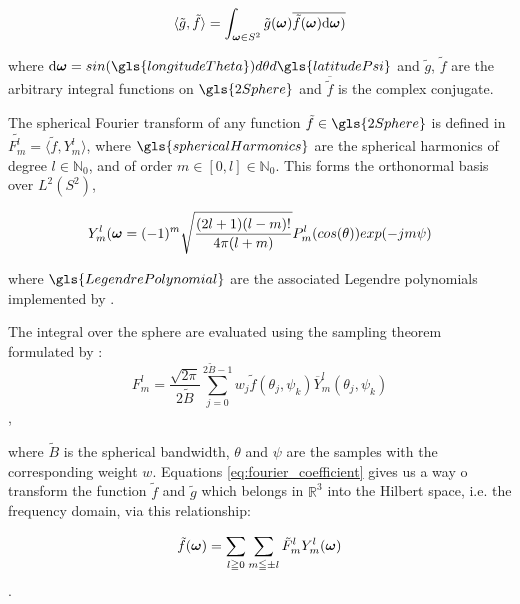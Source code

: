 \begin{equation}\label{eq:hilbert_product}
  \langle \tilde{g} , \tilde{f} \rangle= 
  \int_{\vb*{\omega} \in S^2} 
  \tilde{g}({\vb*{\omega}})\overline{\tilde{f}(\vb*{\omega}) \mathrm{d}\vb*{\omega})}
\end{equation}

where $\mathrm{d}\vb*{\omega} = sin(\gls{longitudeTheta})d\theta d\gls{latitudePsi}$ and $\tilde{g}$, $\tilde{f}$ are the arbitrary 
integral functions on $\gls{2Sphere}$ and $\overline{\tilde{f}}$ is the complex conjugate. 

The spherical Fourier transform of any function $\tilde{f} \in \gls{2Sphere}$ is defined
in $\tilde{F_m^l}= \langle \tilde{f}, Y_m^l \rangle $, where $\gls{sphericalHarmonics}$ are the spherical
harmonics of degree $l \in \mathbb{N}_0$, and of order $m \in [0,l] \in \mathbb{N}_0$.
This forms the orthonormal basis over $L^2(S^2)$,

\begin{equation}\label{eq:spherical_coefficient}
  Y^l_m(\vb*{\omega} = (-1)^m
  \sqrt{ \frac{(2l+1)(l-m)!}{4\pi(l+m)}} 
  P^l_m(cos(\theta))exp(-jm\psi)
\end{equation}

where $\gls{LegendrePolynomial}$ are the associated Legendre polynomials implemented by \textcite{Healy2003}.

The integral over the sphere are evaluated using the sampling theorem formulated by
\textcite{Driscoll1994}:
\begin{equation}\label{eq:fourier_coefficient}
  F_m^l = \frac{\sqrt{2\pi}}{2\tilde{B}} \sum_{j=0}^{2\tilde{B}-1}
    w_j \tilde{f}(\theta_j,\psi_k) \overline{Y}_m^l(\theta_j,\psi_k)
\end{equation},

where $\tilde{B}$ is the spherical bandwidth, $\theta$ and $\psi$ are the samples
with the corresponding weight $w$. Equations \ref{eq:fourier_coefficient} gives
us a way o transform the function $\tilde{f}$ and $\tilde{g}$ which belongs
in $\mathbb{R}^3$ into the Hilbert space, i.e. the
frequency domain, via this relationship:

\begin{equation}\label{fourier_transform}
  \tilde{f}(\vb*{\omega}) = 
  \sum_{l \geqq 0} \sum_{m\leqq \pm l} \tilde{F}^l_m Y^l_m(\vb*{\omega})
\end{equation}.


